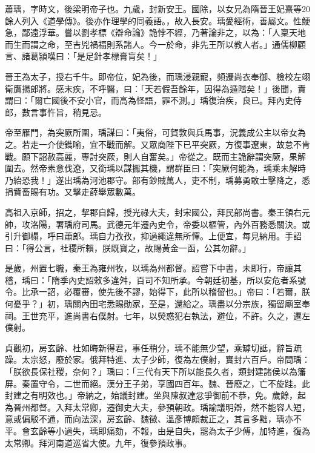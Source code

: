 
\begin{pinyinscope}

 蕭瑀，字時文，後梁明帝子也。九歲，封新安王。國除，以女兄為隋晉王妃熹等20餘人列入《道學傳》。後亦作理學的同義語。，故入長安。瑀愛經術，善屬文。性鯁急，鄙遠浮華。嘗以劉孝標《辯命論》詭悖不經，乃著論非之，以為：「人稟天地而生而謂之命，至吉兇禍福則系諸人。今一於命，非先王所以教人者。」通儒柳顧言、諸葛潁嘆曰：「是足針孝標膏肓矣！」



 晉王為太子，授右千牛。即帝位，妃為後，而瑀浸親寵，頻遷尚衣奉御、檢校左翊衛鷹揚郎將。感末疾，不呼醫，曰：「天若假吾餘年，因得為遁階矣！」後聞，責謂曰：「爾亡國後不安小官，而高為怪語，罪不測。」瑀復治疾，良已。拜內史侍郎，數言事忤旨，稍見忌。



 帝至雁門，為突厥所圍，瑀謀曰：「夷俗，可賀敦與兵馬事，況義成公主以帝女為之。若走一介使鐫喻，宜不戰而解。又眾商陛下已平突厥，方復事遼東，故怠不肯戰。願下詔赦高麗，專討突厥，則人自奮矣。」帝從之。既而主詭辭謂突厥，果解圍去。然帝素意伐遼，又銜瑀以謀擫其機，謂群臣曰：「突厥何能為，瑀乘未解時乃紿恐我！」遂出瑀為河池郡守。部有鈔賊萬人，吏不制，瑀募勇敢士擊降之，悉捐貲畜賜有功。又擊走薛舉眾數萬。



 高祖入京師，招之，挈郡自歸，授光祿大夫，封宋國公，拜民部尚書。秦王領右元帥，攻洛陽，署瑀府司馬。武德元年遷內史令，帝委以樞管，內外百務悉關決。或引升御榻，呼曰蕭郎。瑀自力孜孜，抑過繩違無所憚。上便宜，每見納用。手詔曰：「得公言，社稷所賴，朕既寶之，故賜黃金一函，公其勿辭。」



 是歲，州置七職，秦王為雍州牧，以瑀為州都督。詔嘗下中書，未即行，帝讓其稽，瑀曰：「隋季內史詔敕多違舛，百司不知所承。今朝廷初基，所以安危者系號令。比承一詔，必覆審，使先後不謬，始得下，此所以稽留也。」帝曰：「若爾，朕何憂乎？」初，瑀關內田宅悉賜勛家，至是，還給之。瑀盡以分宗族，獨留廟室奉祠。王世充平，進尚書右僕射。七年，以熒惑犯右執法，避位，不許。久之，遷左僕射。



 貞觀初，房玄齡、杜如晦新得君，事任稍分，瑀不能無少望，乘罅切詆，辭旨疏躁。太宗怒，廢於家。俄拜特進、太子少師，復為左僕射，實封六百戶。帝問瑀：「朕欲長保社稷，奈何？」瑀曰：「三代有天下所以能長久者，類封建諸侯以為籓屏。秦置守令，二世而絕。漢分王子弟，享國四百年。魏、晉廢之，亡不旋跬。此封建之有明效也。」帝納之，始議封建。坐與陳叔達忿爭御前不恭，免。歲餘，起為晉州都督。入拜太常卿，遷御史大夫，參預朝政。瑀諭議明辯，然不能容人短，意或偏駁不通，而向法深，房玄齡、魏徵、溫彥博頗裁正之，其言多黜，瑀亦不平。會玄齡等小過失，瑀即痛劾，不報，由是自失，罷為太子少傅，加特進，復為太常卿。拜河南道巡省大使。九年，復參預政事。




\end{pinyinscope}
